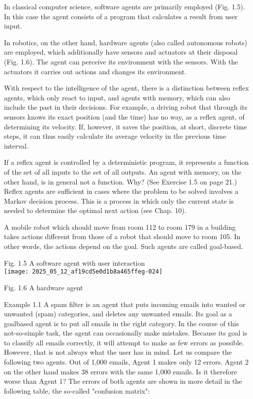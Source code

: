 \documentclass[10pt]{article}
\begin{document}
In classical computer science, software agents are primarily employed (Fig. 1.5). In this case the agent consists of a program that calculates a result from user input.

In robotics, on the other hand, hardware agents (also called autonomous robots) are employed, which additionally have sensors and actuators at their disposal (Fig. 1.6). The agent can perceive its environment with the sensors. With the actuators it carries out actions and changes its environment.

With respect to the intelligence of the agent, there is a distinction between reflex agents, which only react to input, and agents with memory, which can also include the past in their decisions. For example, a driving robot that through its sensors knows its exact position (and the time) has no way, as a reflex agent, of determining its velocity. If, however, it saves the position, at short, discrete time steps, it can thus easily calculate its average velocity in the previous time interval.

If a reflex agent is controlled by a deterministic program, it represents a function of the set of all inputs to the set of all outputs. An agent with memory, on the other hand, is in general not a function. Why? (See Exercise 1.5 on page 21.) Reflex agents are sufficient in cases where the problem to be solved involves a Markov decision process. This is a process in which only the current state is needed to determine the optimal next action (see Chap. 10).

A mobile robot which should move from room 112 to room 179 in a building takes actions different from those of a robot that should move to room 105. In other words, the actions depend on the goal. Such agents are called goal-based.

Fig. 1.5 A software agent with user interaction\\
\texttt{[image: 2025\_05\_12\_af19cd5e0d1b8a465ffeg-024]}

Fig. 1.6 A hardware agent

Example 1.1 A spam filter is an agent that puts incoming emails into wanted or unwanted (spam) categories, and deletes any unwanted emails. Its goal as a goalbased agent is to put all emails in the right category. In the course of this not-so-simple task, the agent can occasionally make mistakes. Because its goal is to classify all emails correctly, it will attempt to make as few errors as possible. However, that is not always what the user has in mind. Let us compare the following two agents. Out of 1,000 emails, Agent 1 makes only 12 errors. Agent 2 on the other hand makes 38 errors with the same 1,000 emails. Is it therefore worse than Agent 1? The errors of both agents are shown in more detail in the following table, the so-called "confusion matrix":
\end{document}
